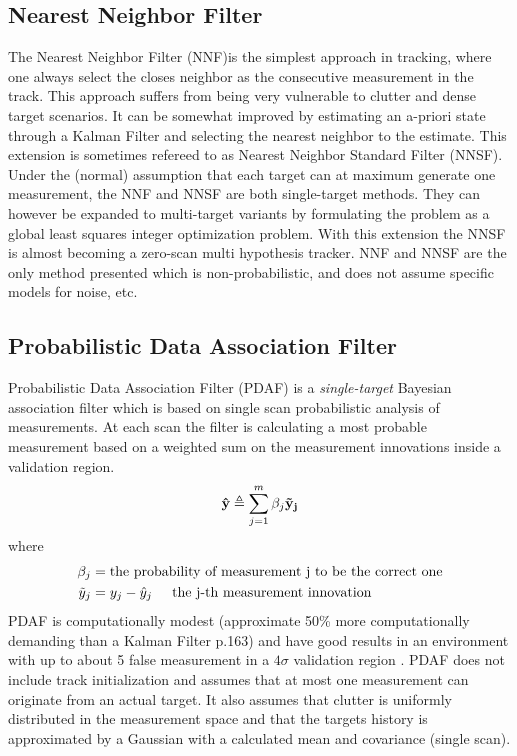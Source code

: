 \subsection{Nearest Neighbor Filter}
The Nearest Neighbor Filter (NNF)is the simplest approach in tracking, where one always select the closes neighbor as the consecutive measurement in the track. This approach suffers from being very vulnerable to clutter and dense target scenarios. It can be somewhat improved by estimating an a-priori state through a Kalman Filter and selecting the nearest neighbor to the estimate. This extension is sometimes refereed to as Nearest Neighbor Standard Filter (NNSF). Under the (normal) assumption that each target can at maximum generate one measurement, the NNF and NNSF are both single-target methods. They can however be expanded to multi-target variants by formulating the problem as a global least squares integer optimization problem. With this extension the NNSF is almost becoming a zero-scan multi hypothesis tracker. NNF and NNSF are the only method presented which is non-probabilistic, and does not assume specific models for noise, etc.

\subsection{Probabilistic Data Association Filter}
Probabilistic Data Association Filter (PDAF) is a \emph{single-target} Bayesian association filter which is based on single scan probabilistic analysis of measurements. At each scan the filter is calculating a most probable measurement based on a weighted sum on the measurement innovations inside a validation region.
\begin{equation}
\boldsymbol{\mathbf{\hat{y}}} \triangleq \sum\limits_{j=1}^m \beta_j \boldsymbol{\mathbf{ \tilde{y}_j }}
\label{PDA_sum}
\end{equation}
where
\begin{equation*}
\begin{split}
	\beta_j		&= \text{the probability of measurement j to be the correct one} \\
	\tilde{y}_j &= y_j - \hat{y}_j \hspace{5mm}	\text{the j-th measurement innovation}
\end{split}
\end{equation*}
PDAF is computationally modest (approximate 50\% more computationally demanding than a Kalman Filter \cite{Bar-Shalom1998} p.163) and have good results in an environment with up to about 5 false measurement in a $4\sigma$ validation region \cite{Bar-Shalom1998}. PDAF does not include track initialization and assumes that at most one measurement can originate from an actual target. It also assumes that clutter is uniformly distributed in the measurement space and that the targets history is approximated by a Gaussian with a calculated mean and covariance (single scan).

